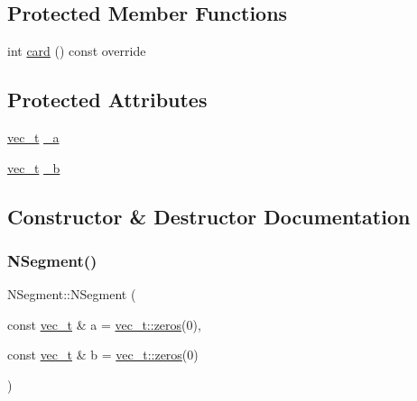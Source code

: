 \subsection*{Protected Member Functions}
\begin{DoxyCompactItemize}
\item 
int \mbox{\hyperlink{class_n_segment_a2fbe9d64e08f8aaa60d09ba8fe0ca2ba}{card}} () const override
\end{DoxyCompactItemize}
\subsection*{Protected Attributes}
\begin{DoxyCompactItemize}
\item 
\mbox{\hyperlink{_n_vector_8h_a0a2cfc67e738a3d73e4f12098c4c07f6}{vec\+\_\+t}} \mbox{\hyperlink{class_n_segment_ae97f9d86f36042b6d90f202c266c5fa2}{\+\_\+a}}
\item 
\mbox{\hyperlink{_n_vector_8h_a0a2cfc67e738a3d73e4f12098c4c07f6}{vec\+\_\+t}} \mbox{\hyperlink{class_n_segment_a46d4842dffd0446c07a92704dd527096}{\+\_\+b}}
\end{DoxyCompactItemize}


\subsection{Constructor \& Destructor Documentation}
\mbox{\label{class_n_segment_a15b93ff64168dac284abf4144148b194}} 
\subsubsection{\texorpdfstring{NSegment()}{NSegment()}}
{\footnotesize\ttfamily N\+Segment\+::\+N\+Segment (\begin{DoxyParamCaption}\item[{const \mbox{\hyperlink{_n_vector_8h_a0a2cfc67e738a3d73e4f12098c4c07f6}{vec\+\_\+t}} \&}]{a = {\ttfamily \mbox{\hyperlink{class_n_vector_a6253cef3c39dd9d388bbf7d17069bc51}{vec\+\_\+t\+::zeros}}(0)},  }\item[{const \mbox{\hyperlink{_n_vector_8h_a0a2cfc67e738a3d73e4f12098c4c07f6}{vec\+\_\+t}} \&}]{b = {\ttfamily \mbox{\hyperlink{class_n_vector_a6253cef3c39dd9d388bbf7d17069bc51}{vec\+\_\+t\+::zeros}}(0)} }\end{DoxyParamCaption})\hspace{0.3cm}{\ttfamily [explicit]}}




